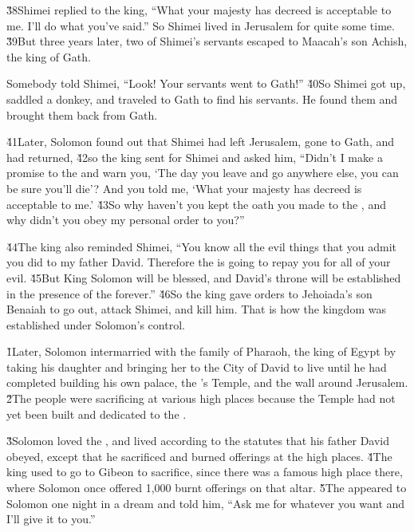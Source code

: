 \v{38}Shimei replied to the king, ``What your majesty has decreed is acceptable to me. I'll do what you've said.'' So Shimei lived in Jerusalem for quite some time. \v{39}But three years later, two of Shimei's servants escaped to Maacah's son Achish, the king of Gath.

Somebody told Shimei, ``Look! Your servants went to Gath!'' \v{40}So Shimei got up, saddled a donkey, and traveled to Gath to find his servants. He found them and brought them back from Gath.

\v{41}Later, Solomon found out that Shimei had left Jerusalem, gone to Gath, and had returned, \v{42}so the king sent for Shimei and asked him, ``Didn't I make a promise to the  and warn you, `The day you leave and go anywhere else, you can be sure you'll die'? And you told me, `What your majesty has decreed is acceptable to me.' \v{43}So why haven't you kept the oath you made to the , and why didn't you obey my personal order to you?''

\v{44}The king also reminded Shimei, ``You know all the evil things that you admit you did to my father David. Therefore the  is going to repay you for all of your evil. \v{45}But King Solomon will be blessed, and David's throne will be established in the presence of the  forever.'' \v{46}So the king gave orders to Jehoiada's son Benaiah to go out, attack Shimei, and kill him. That is how the kingdom was established under Solomon's control.

\v{1}Later, Solomon intermarried with the family of Pharaoh, the king of Egypt by taking his daughter and bringing her to the City of David to live until he had completed building his own palace, the 's Temple, and the wall around Jerusalem. \v{2}The people were sacrificing at various high places because the Temple had not yet been built and dedicated to the .

\v{3}Solomon loved the , and lived according to the statutes that his father David obeyed, except that he sacrificed and burned offerings at the high places. \v{4}The king used to go to Gibeon to sacrifice, since there was a famous high place there, where Solomon once offered 1,000 burnt offerings on that altar. \v{5}The  appeared to Solomon one night in a dream and told him, ``Ask me for whatever you want and I'll give it to you.''

